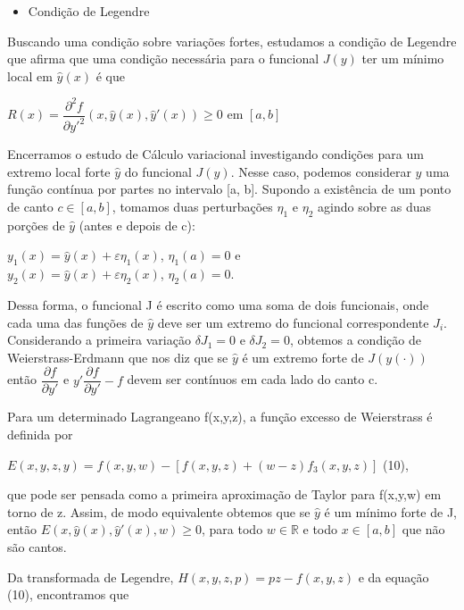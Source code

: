 \documentclass[12pt, a4paper]{article}
\begin{document}
\begin{itemize}
\item Condição de Legendre
\end{itemize}

Buscando uma condição sobre variações fortes, estudamos a condição de Legendre que afirma que uma condição necessária para o funcional $J(y)$ ter um mínimo local em $\hat{y}(x)$ é que 

\begin{center}
$R(x) = \dfrac{\partial^2 f}{\partial y'^2}(x,\hat{y}(x),\hat{y}'(x)) \ge 0$ em  $[a,b]$
\end{center}

Encerramos o estudo de Cálculo variacional investigando condições para um extremo local forte $\hat{y}$ do funcional $J(y)$. Nesse caso, podemos considerar $\hat{y}$ uma função contínua por partes no intervalo [a, b]. Supondo a existência de um ponto de canto $c \in [a,b]$, tomamos duas perturbações $\eta_1$ e $\eta_2$ agindo sobre as duas porções de $\hat{y}$ (antes e depois de c):

\begin{center}
$y_1(x)=\hat{y}(x)+ \varepsilon \eta_1(x)$, $\eta_1(a)=0$ e\\
$y_2(x)=\hat{y}(x)+ \varepsilon \eta_2(x)$, $\eta_2(a)=0$.
\end{center}

Dessa forma, o funcional J é escrito como uma soma de dois funcionais, onde cada uma das funções de $\hat{y}$ deve ser um extremo do funcional correspondente $J_i$. Considerando a primeira variação $\delta J_1=0$ e $\delta J_2=0$, obtemos a condição de Weierstrass-Erdmann que nos diz que se $\hat{y}$ é um extremo forte de $J(y(\cdot))$ então  $\dfrac{\partial f}{\partial y'}$ e $y'\dfrac{\partial f}{\partial y'}-f$ devem ser contínuos em cada lado do canto c.

Para um determinado Lagrangeano f(x,y,z), a função excesso de Weierstrass é definida por 

\begin{center}
$E(x,y,z,y) = f(x,y,w) - [f(x,y,z) + (w-z)f_3 (x,y,z)]$ (10),
\end{center}

que pode ser pensada como a primeira aproximação de Taylor para f(x,y,w) em torno de z. Assim, de modo equivalente obtemos que se $\hat{y}$ é um mínimo forte de J, então $E(x,\hat{y}(x),\hat{y}'(x), w) \ge 0$,   para todo $w \in \mathbb{R}$ e todo $x \in [a,b]$ que não são cantos.

Da transformada de Legendre, $H(x,y,z,p)=pz-f(x,y,z)$ e da equação (10), encontramos que 
\end{document}
